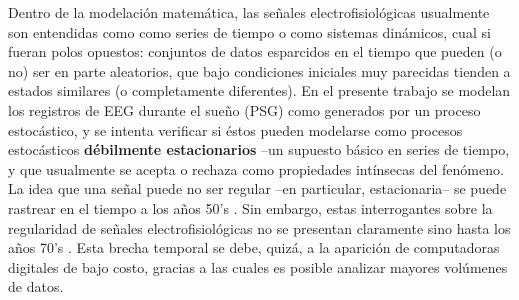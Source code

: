 Dentro de la modelaci\'on matem\'atica, las se\~nales electrofisiol\'ogicas 
usualmente son entendidas como
como series de tiempo o como sistemas din\'amicos, cual si fueran polos opuestos: 
conjuntos de datos esparcidos en el tiempo que pueden (o no) ser en parte aleatorios, que 
bajo condiciones iniciales muy parecidas tienden a estados similares (o completamente diferentes).
En el presente trabajo se modelan 
los registros de EEG durante el sue\~no (PSG)
como generados por un proceso estoc\'astico, y se intenta verificar si
\'estos pueden modelarse como
procesos estoc\'asticos \textbf{d\'ebilmente estacionarios}
--un supuesto b\'asico en series de tiempo, y que 
usualmente se acepta o rechaza como propiedades int\'insecas del fen\'omeno.
La idea que una se\~nal puede no ser regular --en particular, 
estacionaria--
se puede rastrear en el tiempo a los a\~nos 50’s \cite{Page52,Silverman57}. 
Sin embargo, estas interrogantes sobre la regularidad de se\~nales electrofisiol\'ogicas
no se presentan claramente sino hasta los a\~nos 70's
\cite{Kawabata73,McEwen75,Cohen77,Sugimoto78}.
Esta brecha temporal se debe, quiz\'a, a la aparici\'on de computadoras digitales de bajo costo, 
gracias a las cuales es posible analizar mayores vol\'umenes de datos.


